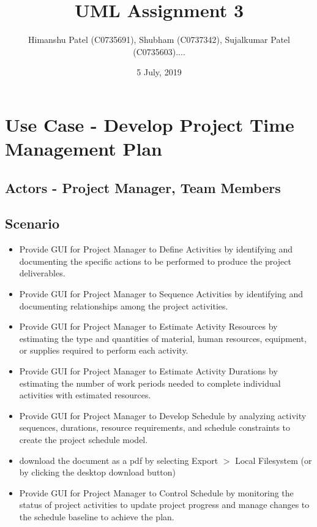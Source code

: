 \documentclass[10pt]{article}
\title{UML Assignment 3}
\author{Himanshu Patel (C0735691), Shubham (C0737342), Sujalkumar Patel (C0735603)....}
\date{5 July, 2019}
\begin{document}
\maketitle
\tableofcontents

\newpage
\section{Use Case - Develop Project Time Management Plan}
\subsection{Actors - Project Manager, Team Members}
\subsection{Scenario}
\begin{itemize}
  \item Provide GUI for Project Manager to Define Activities by identifying and documenting the specific actions to be performed to produce the project deliverables.
  \item Provide GUI for Project Manager to Sequence Activities by identifying and documenting relationships among the project activities.
  \item Provide GUI for Project Manager to Estimate Activity Resources by estimating the type and quantities of material, human resources, equipment, or supplies required to perform each activity.
  \item Provide GUI for Project Manager to Estimate Activity Durations by estimating the number of work periods needed to complete individual activities with estimated resources.
  \item Provide GUI for Project Manager to Develop Schedule by analyzing activity sequences, durations, resource requirements, and schedule constraints to create the project schedule model.
  \item download the document as a pdf by selecting Export $>$ Local
        Filesystem (or by clicking the desktop download button)
  \item Provide GUI for Project Manager to Control Schedule by monitoring the status of project activities to update project progress and manage changes to the schedule baseline to achieve the plan.
\end{itemize}
\end{document}
